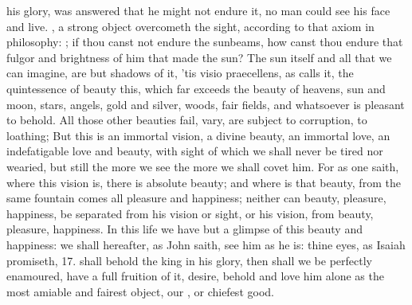 {his glory, was answered that he might not endure it, no man could see
his face and live. , a strong object
overcometh the sight, according to that axiom in philosophy: ; if thou canst not endure
the sunbeams, how canst thou endure that fulgor and brightness of him
that made the sun? The sun itself and all that we can imagine, are but
shadows of it, 'tis visio praecellens, as \Austin{} calls it, the
quintessence of beauty this, which far exceeds the beauty of heavens,
sun and moon, stars, angels, gold and silver, woods, fair fields, and
whatsoever is pleasant to behold. All those other beauties fail, vary,
are subject to corruption, to loathing; But this is an immortal
vision, a divine beauty, an immortal love, an indefatigable love and
beauty, with sight of which we shall never be tired nor wearied, but
still the more we see the more we shall covet him. For as one
saith, where this vision is, there is absolute beauty; and where is
that beauty, from the same fountain comes all pleasure and happiness;
neither can beauty, pleasure, happiness, be separated from his vision
or sight, or his vision, from beauty, pleasure, happiness. In this life
we have but a glimpse of this beauty and happiness: we shall hereafter,
as John saith, see him as he is: thine eyes, as Isaiah promiseth,
 17. shall behold the king in his glory, then shall we be
perfectly enamoured, have a full fruition of it, desire, behold
and love him alone as the most amiable and fairest object, our , or chiefest good.

}
